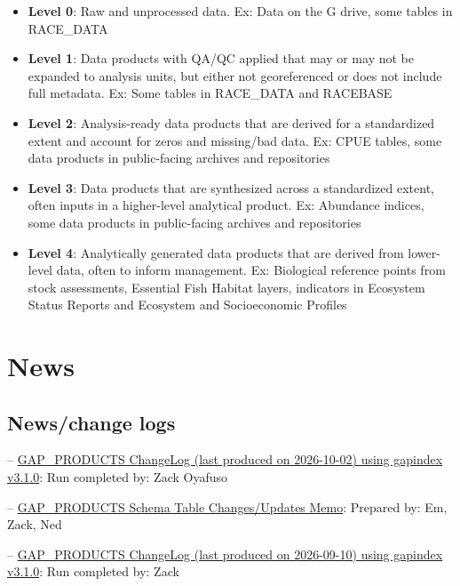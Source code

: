 \documentclass[
  letterpaper,
  oneside,
  open=any]{scrbook}
\providecommand{\tightlist}{%
  \setlength{\itemsep}{0pt}\setlength{\parskip}{0pt}}\usepackage{longtable,booktabs,array}
\begin{document}
\begin{itemize}
\tightlist
\item
  \textbf{Level 0}: Raw and unprocessed data. Ex: Data on the G drive,
  some tables in RACE\_DATA
\item
  \textbf{Level 1}: Data products with QA/QC applied that may or may not
  be expanded to analysis units, but either not georeferenced or does
  not include full metadata. Ex: Some tables in RACE\_DATA and RACEBASE
\item
  \textbf{Level 2}: Analysis-ready data products that are derived for a
  standardized extent and account for zeros and missing/bad data. Ex:
  CPUE tables, some data products in public-facing archives and
  repositories
\item
  \textbf{Level 3}: Data products that are synthesized across a
  standardized extent, often inputs in a higher-level analytical
  product. Ex: Abundance indices, some data products in public-facing
  archives and repositories
\item
  \textbf{Level 4}: Analytically generated data products that are
  derived from lower-level data, often to inform management. Ex:
  Biological reference points from stock assessments, Essential Fish
  Habitat layers, indicators in Ecosystem Status Reports and Ecosystem
  and Socioeconomic Profiles
\end{itemize}

\chapter{News}\label{news}

\section{News/change logs}\label{newschange-logs}

--
\href{https://raw.githubusercontent.com/afsc-gap-products/gap_products/main/content/intro-news/2026-10-02.txt}{GAP\_PRODUCTS
ChangeLog (last produced on 2026-10-02) using gapindex v3.1.0}: Run
completed by: Zack Oyafuso

--
\href{https://raw.githubusercontent.com/afsc-gap-products/gap_products/main/content/intro-news/2026-09-22-table-updates-memo.txt}{GAP\_PRODUCTS
Schema Table Changes/Updates Memo}: Prepared by: Em, Zack, Ned

--
\href{https://raw.githubusercontent.com/afsc-gap-products/gap_products/main/content/intro-news/2026-09-10.txt}{GAP\_PRODUCTS
ChangeLog (last produced on 2026-09-10) using gapindex v3.1.0}: Run
completed by: Zack
\end{document}
